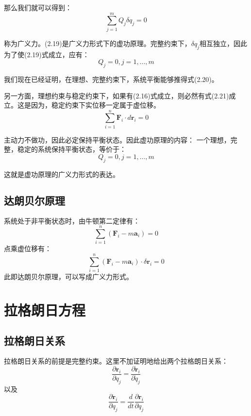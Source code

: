 \documentclass[a4paper, 10pt, openany]{book}%
\begin{document}
   那么我们就可以得到：
   \begin{equation}
    \sum_{j=1}^m Q_j \delta q_j=0
   \end{equation}
   
   称为广义力。(2.19)是广义力形式下的虚功原理。完整约束下，$\delta q_j $相互独立，因此为了使(2.19)式成立，应有：
   \begin{equation}
     Q_j=0,j=1,\dots,m
   \end{equation}

   我们现在已经证明，在理想、完整约束下，系统平衡能够推得式(2.20)。

   另一方面，理想约束与稳定约束下，如果有(2.16)式成立，则必然有式(2.21)成立。这是因为，稳定约束下实位移一定属于虚位移。
   \begin{equation}
  \sum_{i=1}^n \textbf{F}_i \cdot d\textbf{r}_i=0
  \end{equation}
   
   主动力不做功，因此必定保持平衡状态。因此虚功原理的内容：
   一个理想，完整，稳定的系统保持平衡状态，等价于：
   \begin{equation}
    Q_j=0,j=1,\dots,m
   \end{equation}

   这就是虚功原理的广义力形式的表达。
   
   \subsection{达朗贝尔原理}
   系统处于非平衡状态时，由牛顿第二定律有：
   \begin{equation}
    \sum_{i=1}^n (\textbf{F}_i-m\textbf{a}_i)=0
   \end{equation}
    点乘虚位移有：
    \begin{equation}
    \sum_{i=1}^n (\textbf{F}_i-m\textbf{a}_i)\cdot \delta \textbf{r}_i=0
    \end{equation}
    此即达朗贝尔原理，可以写成广义力形式。
    \section{拉格朗日方程}
    \subsection{拉格朗日关系}
    拉格朗日关系的前提是完整约束。这里不加证明地给出两个拉格朗日关系：
    \begin{equation}
        \frac{\partial \textbf{r}_i}{\partial q_j}=\frac{\partial \dot{\textbf{r}}_i}{\partial \dot{q}_j}
    \end{equation}
    以及
    \begin{equation}
        \frac{\partial \dot{\textbf{r}}_i}{\partial q_j}=\frac{d}{dt}\frac{\partial \textbf{r}_i}{\partial q_j}
    \end{equation}
\end{document}
